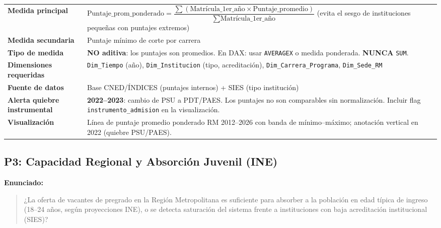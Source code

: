 \documentclass[11pt,a4paper]{article}
\begin{document}
\begin{center}
\small
\begin{tabularx}{\textwidth}{@{}>{\bfseries}p{4.2cm}Y@{}}
\toprule
Medida principal &
  $\text{Puntaje\_prom\_ponderado} =
    \dfrac{\displaystyle\sum(\text{Matrícula\_1er\_año} \times \text{Puntaje\_promedio})}
           {\displaystyle\sum \text{Matrícula\_1er\_año}}$
  (evita el sesgo de instituciones pequeñas con puntajes extremos) \\[4pt]
Medida secundaria & Puntaje mínimo de corte por carrera \\
Tipo de medida &
  \textbf{\color{warnred}NO aditiva}: los puntajes son promedios.
  En DAX: usar \texttt{AVERAGEX} o medida ponderada. \textbf{NUNCA} \texttt{SUM}. \\
Dimensiones requeridas &
  \texttt{Dim\_Tiempo} (año),
  \texttt{Dim\_Institucion} (tipo, acreditación),
  \texttt{Dim\_Carrera\_Programa},
  \texttt{Dim\_Sede\_RM} \\
Fuente de datos &
  Base CNED/ÍNDICES (puntajes internos) + SIES (tipo institución) \\
Alerta quiebre instrumental &
  \textbf{2022--2023}: cambio de PSU a PDT/PAES. Los puntajes no son
  comparables sin normalización. Incluir flag \texttt{instrumento\_admision}
  en la visualización. \\
Visualización &
  Línea de puntaje promedio ponderado RM 2012--2026 con banda de
  mínimo--máximo; anotación vertical en 2022 (quiebre PSU/PAES). \\
\bottomrule
\end{tabularx}
\end{center}

\subsection{P3: Capacidad Regional y Absorción Juvenil (INE)}
\label{sec:p3}

\textbf{Enunciado:}
\begin{quote}
¿La oferta de vacantes de pregrado en la Región Metropolitana es suficiente
para absorber a la población en edad típica de ingreso (18--24 años, según
proyecciones INE), o se detecta saturación del sistema frente a instituciones
con baja acreditación institucional (SIES)?
\end{quote}
\end{document}
